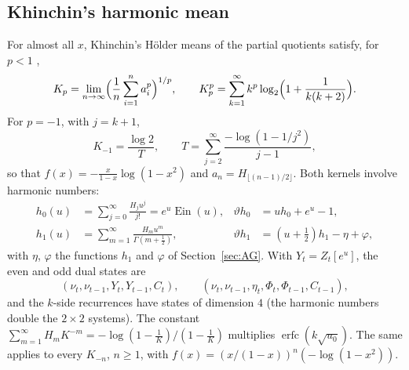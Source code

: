 \documentclass[11pt]{amsart}
\theoremstyle{definition}
\theoremstyle{remark}
\newcommand{\Ein}{\operatorname{Ein}}
\newcommand{\erfc}{\operatorname{erfc}}
\begin{document}
\subsection{Khinchin's harmonic mean}\label{sec:KH}
For almost all $x$, Khinchin's H\"older means of the partial quotients satisfy, for $p < 1$ \cite{BBC97},
\[
  K_p = \lim_{n\to\infty}\Bigl(\frac1n\sum_{i=1}^{n} a_i^p\Bigr)^{1/p}, \qquad
  K_p^p = \sum_{k=1}^{\infty}k^p\log_2\Bigl(1 + \frac1{k(k+2)}\Bigr).
\]
For $p = -1$, with $j = k+1$,
\[
  K_{-1} = \frac{\log 2}{T}, \qquad T = \sum_{j=2}^{\infty}\frac{-\log(1-1/j^2)}{j-1},
\]
so that $f(x) = -\frac{x}{1-x}\log(1-x^2)$ and $a_n = H_{\lfloor(n-1)/2\rfloor}$.
Both kernels involve harmonic numbers:
\begin{align*}
  h_0(u) &= \sum_{j=0}^{\infty}\frac{H_j u^j}{j!} = e^u\Ein(u), & \vartheta h_0 &= uh_0 + e^u - 1, \\
  h_1(u) &= \sum_{m=1}^{\infty}\frac{H_mu^m}{\Gamma(m+\frac12)}, & \vartheta h_1 &= (u+\tfrac12)h_1 - \eta + \varphi,
\end{align*}
with $\eta$, $\varphi$ the functions $h_1$ and $\varphi$ of Section~\ref{sec:AG}. With $Y_t = Z_t[e^u]$, the even
and odd dual states are
\[
  (\nu_t, \nu_{t-1}, Y_t, Y_{t-1}, C_t), \qquad (\nu_t, \nu_{t-1}, \eta_t, \Phi_t, \Phi_{t-1}, C_{t-1}),
\]
and
the $k$-side recurrences have states of dimension $4$ (the harmonic numbers double the $2\times2$ systems). The
constant $\sum_{m=1}^{\infty} H_mK^{-m} = -\log(1-\frac1K)/(1-\frac1K)$ multiplies $\erfc(k\sqrt{u_0})$.
The same applies to every $K_{-n}$, $n \ge 1$, with $f(x) = (x/(1-x))^n(-\log(1-x^2))$.
\end{document}
